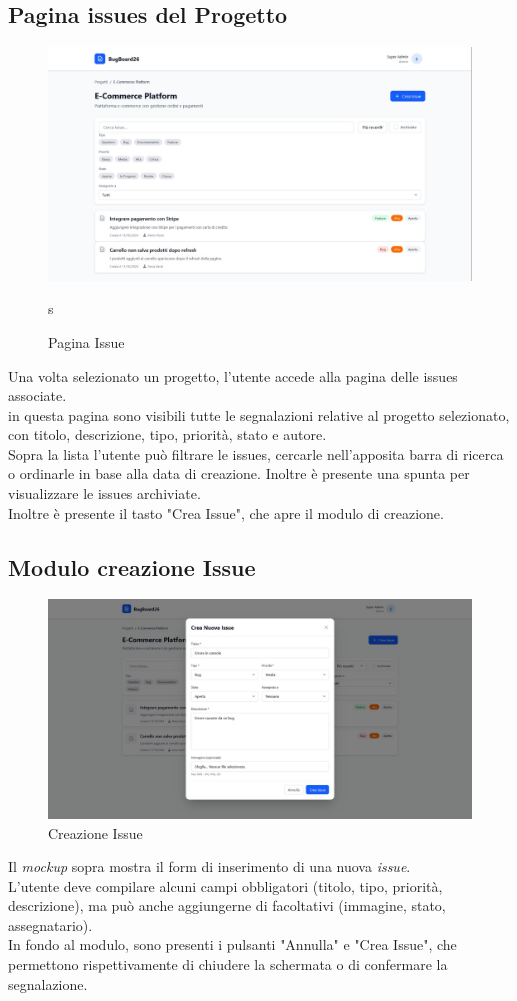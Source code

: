 \subsection{Pagina issues del Progetto}
\begin{figure}
	\centering
	\includegraphics[width=1\linewidth]{./Assets/Chapters/mkp3.jpg}
	\caption{Pagina Issue}s
\end{figure}
Una volta selezionato un progetto, l'utente accede alla pagina delle issues associate.\\
in questa pagina sono visibili tutte le segnalazioni relative al progetto selezionato, con titolo, descrizione, tipo, priorità, stato e autore.\\
Sopra la lista l'utente può filtrare le issues, cercarle nell'apposita barra di ricerca o ordinarle in base alla data di creazione. Inoltre è presente una spunta per visualizzare le issues archiviate.\\
Inoltre è presente il tasto "Crea Issue", che apre il modulo di creazione.


\subsection{Modulo creazione Issue}
\begin{figure}
	\centering
	\includegraphics[width=1\linewidth]{./Assets/Chapters/mkp4.jpg}
	\caption{Creazione Issue}
\end{figure}
Il \textit{mockup} sopra mostra il form di inserimento di una nuova \textit{issue}.\\
L'utente deve compilare alcuni campi obbligatori (titolo, tipo, priorità, descrizione), ma può anche aggiungerne di facoltativi (immagine, stato, assegnatario).\\
In fondo al modulo, sono presenti i pulsanti "Annulla" e "Crea Issue", che permettono rispettivamente di chiudere la schermata o di confermare la segnalazione.

